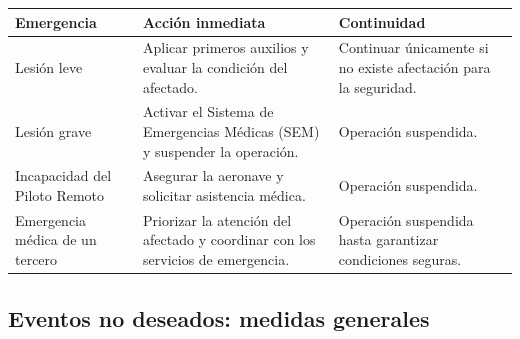 \begin{longtable}{|p{4.5cm}|p{6cm}|p{3.5cm}|}
\hline

\textbf{Emergencia} &
\textbf{Acción inmediata} &
\textbf{Continuidad}

\\ \hline

Lesión leve &
Aplicar primeros auxilios y evaluar la condición del afectado. &
Continuar únicamente si no existe afectación para la seguridad.

\\ \hline

Lesión grave &
Activar el Sistema de Emergencias Médicas (SEM) y suspender la operación. &
Operación suspendida.

\\ \hline

Incapacidad del Piloto Remoto &
Asegurar la aeronave y solicitar asistencia médica. &
Operación suspendida.

\\ \hline

Emergencia médica de un tercero &
Priorizar la atención del afectado y coordinar con los servicios de emergencia. &
Operación suspendida hasta garantizar condiciones seguras.

\\ \hline

\end{longtable}




\subsection{Eventos no deseados: medidas generales}

